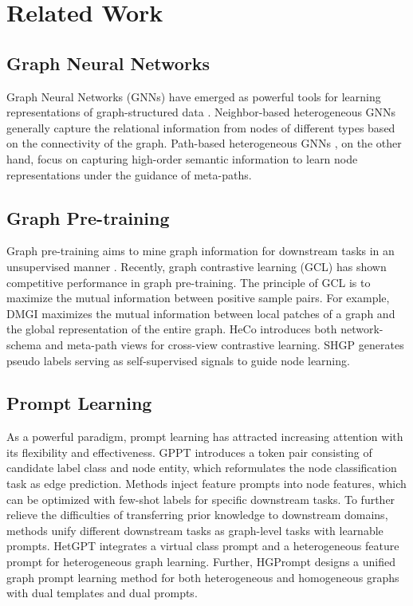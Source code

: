 \section{Related Work}

\subsection{Graph Neural Networks}

Graph Neural Networks (GNNs) have emerged as powerful tools for learning representations of graph-structured data \cite{GCN,GAT,nips24sun}. Neighbor-based heterogeneous GNNs \cite{RGCN,HetGNN} generally capture the relational information from nodes of different types based on the connectivity of the graph. Path-based heterogeneous GNNs \cite{GTN,HGT,HAN,MAGNN}, on the other hand, focus on capturing high-order semantic information to learn node representations under the guidance of meta-paths.

\vspace{-2mm}

\subsection{Graph Pre-training}

Graph pre-training aims to mine graph information for downstream tasks in an unsupervised manner \cite{www25sun}. Recently, graph contrastive learning (GCL) \cite{GraphCL,GCC,GCA,aaai22selfMG,aaai23sun} has shown competitive performance in graph pre-training. The principle of GCL is to maximize the mutual information between positive sample pairs. For example, DMGI \cite{DMGI} maximizes the mutual information between local patches of a graph and the global representation of the entire graph. HeCo \cite{HeCo} introduces both network-schema and meta-path views for cross-view contrastive learning. SHGP \cite{SHGP} generates pseudo labels serving as self-supervised signals to guide node learning.

\vspace{-2mm}

\subsection{Prompt Learning}

As a powerful paradigm, prompt learning has attracted increasing attention with its flexibility and effectiveness. GPPT \cite{GPPT} introduces a token pair consisting of candidate label class and node entity, which reformulates the node classification task as edge prediction. Methods \cite{GPF,VNT-GPPE} inject feature prompts into node features, which can be optimized with few-shot labels for specific downstream tasks. To further relieve the difficulties of transferring prior knowledge to downstream domains, methods \cite{All,GraphPrompt} unify different downstream tasks as graph-level tasks with learnable prompts. HetGPT \cite{HetGPT} integrates a virtual class prompt and a heterogeneous feature prompt for heterogeneous graph learning. Further, HGPrompt \cite{HGPrompt} designs a unified graph prompt learning method for both heterogeneous and homogeneous graphs with dual templates and dual prompts.